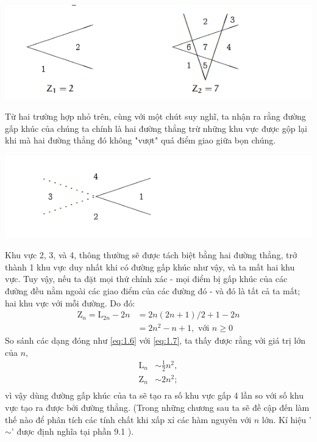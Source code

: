 \begin{center}
    \includegraphics[width=1\textwidth]{assets/chapter1/small-case-zig-zag.png}
\end{center}

Từ hai trường hợp nhỏ trên, cùng với một chút suy nghĩ,
ta nhận ra rằng đường gấp khúc của chúng ta chính là hai đường thẳng trừ những khu vực được gộp lại khi mà hai đường thẳng đó không "vượt" quá điểm giao giữa bọn chúng.
\begin{center}
    \includegraphics[width=1\textwidth]{assets/chapter1/zig-zag-explanation.png}
\end{center}
Khu vực 2, 3, và 4, thông thường sẽ được tách biệt bằng hai đường thẳng, trở thành 1 khu vực duy nhất khi có đường gấp khúc như vậy, và ta mất hai khu vực. Tuy vậy, nếu ta đặt mọi thứ chính xác - mọi điểm bị gấp khúc của các đường đều nằm ngoài các giao điểm của các đường đó - và đó là tất cả ta mất; hai khu vực với mỗi đường.
Do đó: 
\begin{equation}\label{eq:1.7}
    \begin{aligned}
        \mathrm{Z}_n = \mathrm{L}_{2n} - 2n & = 2n(2n + 1) / 2 + 1 - 2n \\
                                            & = 2n^2 - n + 1, \text{\ \ \ \ với } n \geq 0
    \end{aligned}
\end{equation}
So sánh các dạng đóng như \eqref{eq:1.6} với \eqref{eq:1.7}, ta thấy được rằng với giá trị lớn của $n$,
\begin{equation*}
    \begin{aligned}
        \mathrm{L}_n & \sim \frac{1}{2}n^2, \\
        \mathrm{Z}_n & \sim 2n^2; \\
    \end{aligned}
\end{equation*}
vì vậy dùng đường gấp khúc của ta sẽ tạo ra số khu vực gấp 4 lần so với số khu vực tạo ra được bởi đường thẳng. (Trong những chương sau ta sẽ đề cập đến làm thế nào để phân tích các tính chất khi xấp xỉ các hàm nguyên với $n$ lớn. Kí hiệu '$\sim$' được định nghĩa tại phần 
9.1%
).